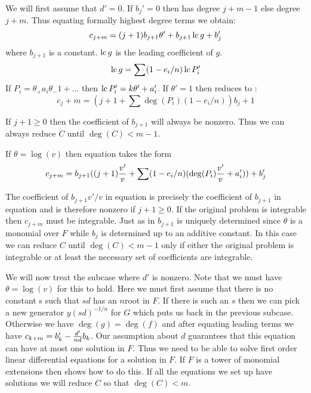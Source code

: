 We will first assume that $d' =0$. If $b_j' = 0$ then
 has degree $j+m-1$ else degree $j+m$.
Thus equating formally highest degree terms we obtain:
\begin{equation}
c_{j+m} = (j+1) b_{j+1} \theta' + b_{j+1} \mathop{\rm lc}\nolimits g + b_j'
\label{Simple:Int:Alg:Eq:b}
\end{equation}
where $b_{j+1}$ is a constant.  $\mathop{\rm lc}\nolimits g$ is the leading coefficient of $g$.
\[
\mathop{\rm lc}\nolimits g = \sum (1-e_i /n) \mathop{\rm lc}\nolimits P_i'
\]
If $P_i = \theta_ + a_i \theta_-1 + \ldots$ then $\mathop{\rm lc}\nolimits P_i' = k
\theta' + a_i'$. If $\theta' = 1$ then 
reduces to : 
\begin{equation}
c_j+m = ( j + 1 + \sum \deg(P_i ) (1-e_i /n)) b_j+1
\label{Simple:Int:Alg:Eq:c}
\end{equation}

If $j+1 \ge 0$ then the coefficient of $b_{j+1}$ will always be
nonzero.  Thus we can always reduce $C$ until $\deg(C) < m-1$.

If $\theta = \log(v)$ then equation  takes the form
\begin{equation}
  c_{j+m} = b_{j+1} ((j+1){v' \over v} 
    + \sum (1-e_i /n) (\deg(P_i ) {v' \over v} + a_i' )) + b_j'
\label{Simple:Int:Alg:Eq:d}
\end{equation}

The coefficient of $b_{j+1} {v'} / v$ in equation
 is precisely the coefficient of $b_{j+1}$
in equation  and is therefore nonzero if
$j+1 \ge 0$.  If the original problem is integrable then $c_{j+m}$
must be integrable.  Just as in \cite{Risch:Integration:Trans} $b_{j+1}$ is uniquely
determined since $\theta$ is a monomial over $F$ while $b_j$ is
determined up to an additive constant.  In this case we can reduce $C$
until $\deg(C) < m-1$ only if either the original problem is
integrable or at least the necessary set of coefficients are
integrable.

We will now treat the subcase where $d'$ is nonzero. Note that
we must have $\theta = \log (v)$ for this to hold. Here we must first
assume that there is no constant s such that $sd$ has an $n$\th root
in $F$.  If there is such an $s$ then we can pick a new generator 
$y (sd)^{-1/n}$ for $G$ which puts us back in the previous subcase.
Otherwise we have $\deg(g) = \deg (f)$ and after equating leading
terms we have $c_{k+m} = b_k' - {d' \over n d} b_k$.
Our assumption about $d$ guarantees that this equation can have 
at most one solution in $F$.  Thus we need to be able to solve 
first order linear differential equations for a solution in $F$.
If $F$  is a tower of monomial extensions then \cite{Risch:Integration:Trans} shows how
to do this.  If all the equations we set up have solutions 
we will reduce $C$ so that $\deg(C) < m$.

